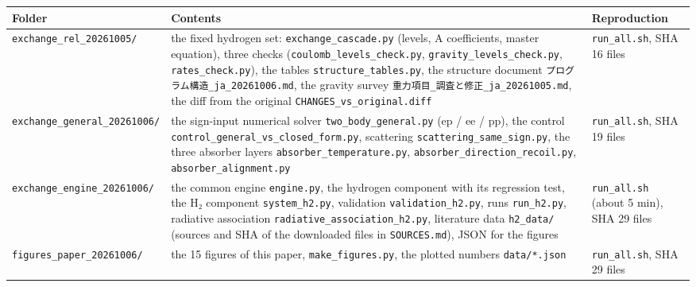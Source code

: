 \documentclass[
  a4paper,
]{article}
\newcounter{none} %
\begin{document}
{\def\LTcaptype{none} %
\begin{longtable}[]{@{}
  >{\raggedright\arraybackslash}p{}
  >{\raggedright\arraybackslash}p{}
  >{\raggedright\arraybackslash}p{}@{}}
\toprule\noalign{}
\begin{minipage}[b]{\linewidth}\raggedright
Folder
\end{minipage} & \begin{minipage}[b]{\linewidth}\raggedright
Contents
\end{minipage} & \begin{minipage}[b]{\linewidth}\raggedright
Reproduction
\end{minipage} \\
\midrule\noalign{}
\endhead
\bottomrule\noalign{}
\endlastfoot
\texttt{exchange\_rel\_20261005/} & the fixed hydrogen set:
\texttt{exchange\_cascade.py} (levels, A coefficients, master equation),
three checks (\texttt{coulomb\_levels\_check.py},
\texttt{gravity\_levels\_check.py}, \texttt{rates\_check.py}), the
tables \texttt{structure\_tables.py}, the structure document
\texttt{プログラム構造\_ja\_20261006.md}, the gravity survey
\texttt{重力項目\_調査と修正\_ja\_20261005.md}, the diff from the
original \texttt{CHANGES\_vs\_original.diff} & \texttt{run\_all.sh}, SHA
16 files \\
\texttt{exchange\_general\_20261006/} & the sign-input numerical solver
\texttt{two\_body\_general.py} (ep / ee / pp), the control
\texttt{control\_general\_vs\_closed\_form.py}, scattering
\texttt{scattering\_same\_sign.py}, the three absorber layers
\texttt{absorber\_temperature.py},
\texttt{absorber\_direction\_recoil.py}, \texttt{absorber\_alignment.py}
& \texttt{run\_all.sh}, SHA 19 files \\
\texttt{exchange\_engine\_20261006/} & the common engine
\texttt{engine.py}, the hydrogen component with its regression test, the
H₂ component \texttt{system\_h2.py}, validation
\texttt{validation\_h2.py}, runs \texttt{run\_h2.py}, radiative
association \texttt{radiative\_association\_h2.py}, literature data
\texttt{h2\_data/} (sources and SHA of the downloaded files in
\texttt{SOURCES.md}), JSON for the figures & \texttt{run\_all.sh} (about
5 min), SHA 29 files \\
\texttt{figures\_paper\_20261006/} & the 15 figures of this paper,
\texttt{make\_figures.py}, the plotted numbers \texttt{data/*.json} &
\texttt{run\_all.sh}, SHA 29 files \\
\end{longtable}
}
\end{document}
